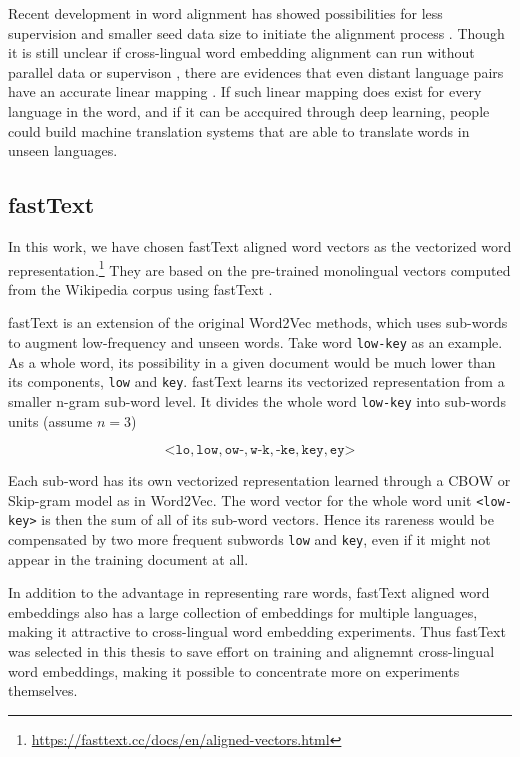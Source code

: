 \documentclass[thesis,fonts=libertine]{cluu}
\begin{document}
Recent development in word alignment has showed possibilities for less supervision and smaller seed data size to initiate the alignment process \parencite{Ruder:2019aa}. Though it is still unclear if cross-lingual word embedding alignment can run without parallel data or supervison \parencite{Dyer1365879}, there are evidences that even distant language pairs have an accurate linear mapping \parencite{Mikolov:2013ac}. If such linear mapping does exist for every language in the word, and if it can be accquired through deep learning, people could build machine translation systems that are able to translate words in unseen languages.

\subsection{fastText}
\label{sec:fasttext}

In this work, we have chosen fastText aligned word vectors \parencite{Joulin:2018aa} as the vectorized word representation.\footnote{\url{https://fasttext.cc/docs/en/aligned-vectors.html}} They are based on the pre-trained monolingual vectors computed from the Wikipedia corpus using fastText \parencite{Bojanowski:2016aa}.

fastText is an extension of the original Word2Vec methods, which uses sub-words to augment low-frequency and unseen words. Take word \texttt{low-key} as an example. As a whole word, its possibility in a given document would be much lower than its components, \texttt{low} and \texttt{key}. fastText learns its vectorized representation from a smaller n-gram sub-word level. It divides the whole word \texttt{low-key} into sub-words units (assume $n=3$)

\begin{equation*}
  \mathtt{\text{<}lo, low, ow\text{-}, w\text{-}k, \text{-}ke, key, ey\text{>}}
\end{equation*}

\noindent Each sub-word has its own vectorized representation learned through a CBOW or Skip-gram model as in Word2Vec. The word vector for the whole word unit \texttt{<low-key>} is then the sum of all of its sub-word vectors. Hence its rareness would be compensated by two more frequent subwords \texttt{low} and \texttt{key}, even if it might not appear in the training document at all.

In addition to the advantage in representing rare words, fastText aligned word embeddings also has a large collection of embeddings for multiple languages, making it attractive to cross-lingual word embedding experiments. Thus fastText was selected in this thesis to save effort on training and alignemnt cross-lingual word embeddings, making it possible to concentrate more on experiments themselves.
\end{document}

